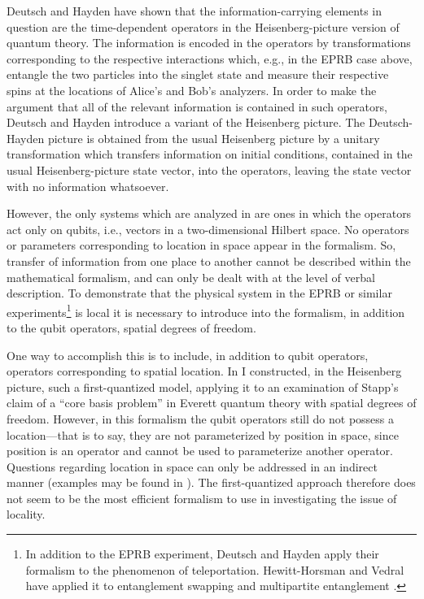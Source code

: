 \documentclass[12pt]{article}
\begin{document}
Deutsch and Hayden \cite{DeutschHayden00} have shown that the information-carrying elements in question are  the time-dependent operators
in the Heisenberg-picture version of quantum theory. The information is encoded in the operators by transformations corresponding  to  the respective interactions which, e.g., in the
EPRB case above, entangle the two particles into the singlet state and measure their respective spins
at the locations of Alice's and Bob's analyzers. In order to make the argument that all of
the relevant information is contained in such operators, Deutsch and Hayden introduce a variant
of the Heisenberg picture. The Deutsch-Hayden picture  is obtained from the usual Heisenberg
picture by a unitary transformation which transfers  information on initial conditions, 
contained in the usual Heisenberg-picture state vector, into the operators, leaving the state vector
with no information whatsoever. 

However, the only systems which are analyzed in \cite{DeutschHayden00} are ones in which the operators 
act only on qubits, i.e., vectors in a two-dimensional Hilbert space.  No operators or parameters corresponding to
location in space 
appear in the formalism. So, transfer of information from one place to another cannot be described within 
the mathematical formalism, and can only be dealt with at the level of verbal description.  To demonstrate that the physical system
in the EPRB or similar experiments\footnote{In addition to the EPRB experiment, Deutsch and Hayden \cite{DeutschHayden00}  apply their formalism to the phenomenon
of teleportation. Hewitt-Horsman and Vedral have applied it to entanglement swapping \cite{HewittHorsmanVedral07Dev} and 
multipartite entanglement \cite{HewittHorsmanVedral07Ent}.}   is local it is necessary to introduce into the formalism, in addition to the qubit operators, spatial 
degrees of freedom. 

One way to accomplish this is to include, in addition to qubit operators, operators corresponding to
spatial location. In \cite{Rubin06} I constructed,  in the Heisenberg picture, such a first-quantized model, 
applying it to an examination of Stapp's claim \cite{Stapp02} of a ``core
basis problem'' in Everett quantum theory with spatial degrees of freedom. 
However, in this formalism the qubit operators still do not possess a location---that is to say,
they are not parameterized by position in space, since position is an operator and cannot be used to 
parameterize another operator. Questions regarding location in space
can only be addressed in an indirect manner (examples may be found in \cite{Rubin06}). The
first-quantized approach therefore does not seem 
to be the most efficient formalism to use in investigating the issue of locality.
\end{document}

